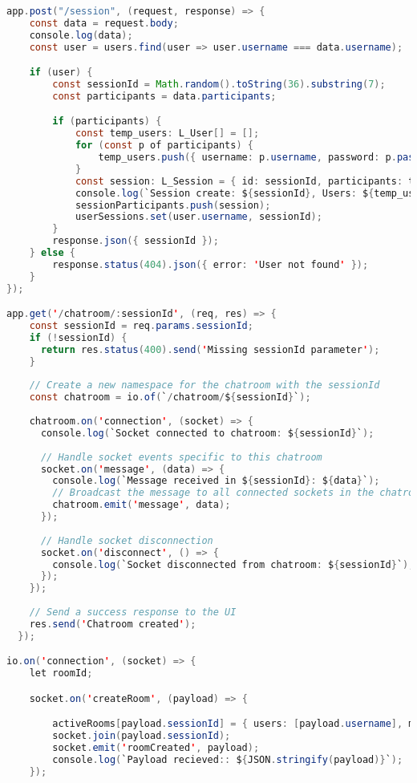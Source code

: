 \begin{lstlisting}[language=Java, caption={Express Backend Server}, label={lst:java}]
app.post("/session", (request, response) => {
    const data = request.body;
    console.log(data);
    const user = users.find(user => user.username === data.username);

    if (user) {
        const sessionId = Math.random().toString(36).substring(7);
        const participants = data.participants;

        if (participants) {
            const temp_users: L_User[] = [];
            for (const p of participants) {
                temp_users.push({ username: p.username, password: p.password })
            }
            const session: L_Session = { id: sessionId, participants: temp_users };
            console.log(`Session create: ${sessionId}, Users: ${temp_users.toString()}`)
            sessionParticipants.push(session);
            userSessions.set(user.username, sessionId);
        }
        response.json({ sessionId });
    } else {
        response.status(404).json({ error: 'User not found' });
    }
});

app.get('/chatroom/:sessionId', (req, res) => {
    const sessionId = req.params.sessionId;
    if (!sessionId) {
      return res.status(400).send('Missing sessionId parameter');
    }
  
    // Create a new namespace for the chatroom with the sessionId
    const chatroom = io.of(`/chatroom/${sessionId}`);
  
    chatroom.on('connection', (socket) => {
      console.log(`Socket connected to chatroom: ${sessionId}`);
  
      // Handle socket events specific to this chatroom
      socket.on('message', (data) => {
        console.log(`Message received in ${sessionId}: ${data}`);
        // Broadcast the message to all connected sockets in the chatroom
        chatroom.emit('message', data);
      });
  
      // Handle socket disconnection
      socket.on('disconnect', () => {
        console.log(`Socket disconnected from chatroom: ${sessionId}`);
      });
    });
  
    // Send a success response to the UI
    res.send('Chatroom created');
  });

io.on('connection', (socket) => {
    let roomId;

    socket.on('createRoom', (payload) => {

        activeRooms[payload.sessionId] = { users: [payload.username], messages: [] };
        socket.join(payload.sessionId);
        socket.emit('roomCreated', payload);
        console.log(`Payload recieved:: ${JSON.stringify(payload)}`);
    });


\end{lstlisting}
